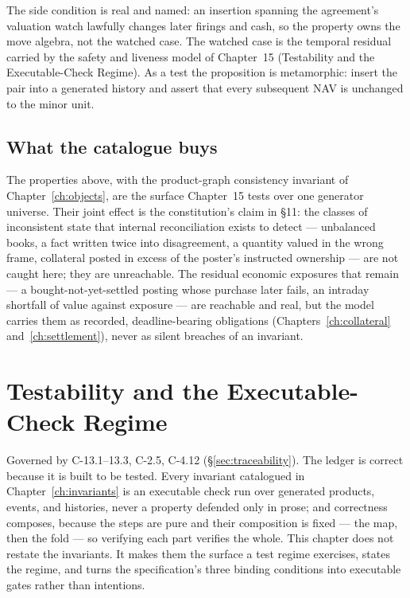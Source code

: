 \documentclass[11pt,a4paper]{article}
\begin{document}
The side condition is real and named: an insertion spanning the agreement's
valuation watch lawfully changes later firings and cash, so the property owns the
move algebra, not the watched case. The watched case is the temporal residual
carried by the safety and liveness model of Chapter~15 (Testability and the
Executable-Check Regime). As a test the proposition is metamorphic: insert the
pair into a generated history and assert that every subsequent NAV is unchanged to
the minor unit.

\subsection{What the catalogue buys}

The properties above, with the product-graph consistency invariant of
Chapter~\ref{ch:objects}, are the surface Chapter~15 tests over one
generator universe. Their joint effect is the constitution's claim in \S 11: the
classes of inconsistent state that internal reconciliation exists to detect ---
unbalanced books, a fact written twice into disagreement, a quantity valued in the
wrong frame, collateral posted in excess of the poster's instructed ownership --- are
not caught here; they are unreachable. The
residual economic exposures that remain --- a bought-not-yet-settled posting whose
purchase later fails, an intraday shortfall of value against exposure --- are reachable
and real, but the model carries them as recorded, deadline-bearing obligations
(Chapters~\ref{ch:collateral} and~\ref{ch:settlement}), never as silent breaches of an
invariant.

\section{Testability and the Executable-Check Regime}\label{ch:testability}

Governed by C-13.1--13.3, C-2.5, C-4.12 (\S\ref{sec:traceability}). The ledger is correct because it is built to be tested. Every invariant catalogued in
Chapter~\ref{ch:invariants} is an executable check run over generated products, events, and
histories, never a property defended only in prose; and correctness composes, because the
steps are pure and their composition is fixed --- the map, then the fold --- so verifying
each part verifies the whole. This chapter does not restate the invariants. It makes them
the surface a test regime exercises, states the regime, and turns the specification's three
binding conditions into executable gates rather than intentions.
\end{document}
